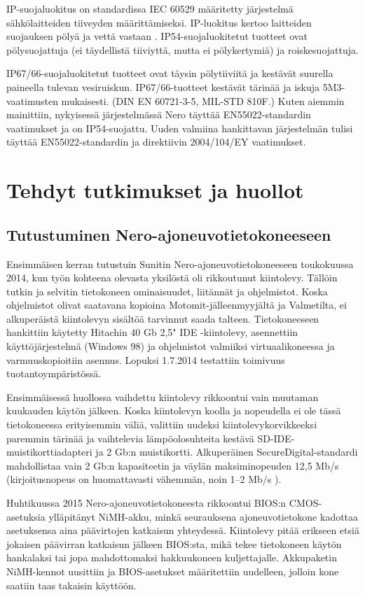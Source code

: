 IP-suojaluokitus on standardissa IEC 60529 määritetty järjestelmä sähkölaitteiden tiiveyden määrittämiseksi. IP-luokitus kertoo laitteiden suojauksen pölyä ja vettä vastaan \cite{IEC60529}. IP54-suojaluokitetut tuotteet ovat pölysuojattuja (ei täydellistä tiiviyttä, mutta ei pölykertymiä) ja roiskesuojattuja.

IP67/66-suojaluokitetut tuotteet ovat täysin pölytiiviitä ja kestävät suurella paineella tulevan vesiruiskun. IP67/66-tuotteet kestävät tärinää ja iskuja 5M3-vaatimusten mukaisesti. (DIN EN 60721-3-5, MIL-STD 810F.) Kuten aiemmin mainittiin, nykyisessä järjestelmässä Nero täyttää EN55022-standardin vaatimukset ja on IP54-suojattu. Uuden valmiina hankittavan järjestelmän tulisi täyttää EN55022-standardin ja direktiivin  2004/104/EY vaatimukset.

\newpage
\chapter{Tehdyt tutkimukset ja huollot}

\section{Tutustuminen Nero-ajoneuvotietokoneeseen}
Ensimmäisen kerran tutustuin Sunitin Nero-ajoneuvotietokoneeseen toukokuussa 2014, kun työn kohteena olevasta yksilöstä oli rikkoutunut kiintolevy. Tällöin tutkin ja selvitin tietokoneen ominaisuudet, liitännät ja ohjelmistot. Koska ohjelmistot olivat saatavana kopioina Motomit-jälleenmyyjältä ja Valmetilta, ei alkuperäistä kiintolevyn sisältöä tarvinnut saada talteen. Tietokoneeseen hankittiin käytetty Hitachin 40 Gb 2,5" IDE -kiintolevy, asennettiin käyttöjärjestelmä (Windows 98) ja ohjelmistot valmiiksi virtuaalikoneessa ja varmuuskopioitiin asennus. Lopuksi 1.7.2014 testattiin toimivuus tuotantoympäristössä.

Ensimmäisessä huollossa vaihdettu kiintolevy rikkoontui vain muutaman kuukauden käytön jälkeen. Koska kiintolevyn koolla ja nopeudella ei ole tässä tietokoneessa erityisemmin väliä, valittiin uudeksi kiintolevykorvikkeeksi paremmin tärinää ja vaihtelevia lämpöolosuhteita kestävä SD-IDE-muistikorttiadapteri ja 2 Gb:n muistikortti. Alkuperäinen SecureDigital-standardi mahdollistaa vain 2 Gb:n kapasiteetin ja väylän maksiminopeuden 12,5 Mb/s (kirjoitusnopeus on huomattavasti vähemmän, noin 1--2 Mb/s ). \citep{sd:2gb}

Huhtikuussa 2015 Nero-ajoneuvotietokoneesta rikkoontui BIOS:n CMOS-asetuksia ylläpitänyt NiMH-akku, minkä seurauksena ajoneuvotietokone kadottaa asetuksensa aina päävirtojen katkaisun yhteydessä. Kiintolevy pitää erikseen etsiä jokaisen päävirran katkaisun jälkeen BIOS:sta, mikä tekee tietokoneen käytön hankalaksi tai jopa mahdottomaksi hakkuukoneen kuljettajalle. Akkupaketin NiMH-kennot uusittiin ja BIOS-asetukset määritettiin uudelleen, jolloin kone saatiin taas takaisin käyttöön.

